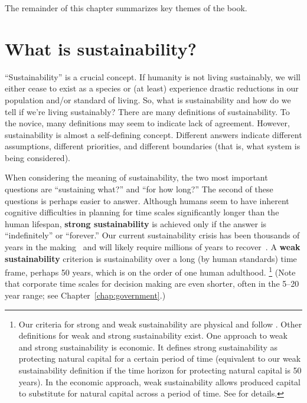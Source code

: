 \documentclass{article}\usepackage[]{graphicx}\usepackage[table]{xcolor}
\begin{document}
The remainder of this chapter summarizes key themes of the book.


\section{What is sustainability?}
\label{sec:what_is_sustainability}

``Sustainability'' is a crucial concept.
If humanity is not living sustainably, we will either cease to exist as a species
or (at least) experience drastic reductions in our population and/or standard of living.
So, what is sustainability and how do we tell if we're living sustainably?
There are many definitions of sustainability.
To the novice, many definitions may seem to indicate lack of agreement.
However, sustainability is almost a self-defining concept.
Different answers indicate different assumptions, different priorities, and different
boundaries (that is, what system is being considered).

When considering the meaning of sustainability, the two most important questions are
``sustaining what?'' and ``for how long?''
The second of these questions is perhaps easier to answer.
Although humans seem to have inherent cognitive difficulties in planning for
time scales significantly longer than the human lifespan,
\textbf{strong sustainability} is achieved only if the answer is
``indefinitely'' or ``forever.''
Our current sustainability crisis has been thousands of years in the making~\cite{Sanderman2017}
and will likely require millions of years to recover~\cite{Davis11262}.
A \textbf{weak sustainability} criterion is sustainability over a long (by human standards)
time frame, perhaps 50 years, which is on the order of one human adulthood.%
\footnote{
  Our criteria for strong and weak sustainability are physical and
  follow \citet{Graedel:2010ab}.
  Other definitions for weak and strong sustainability exist.
  One approach to weak and strong sustainability is economic.
  It defines strong sustainability as protecting natural capital 
  for a certain period of time
  (equivalent to our weak sustainability definition 
  if the time horizon for protecting natural capital is 50 years).
  In the economic approach,
  weak sustainability allows 
  produced capital
  to substitute for natural capital
  across a period of time.
  See \citet{Dietz:2007tu} for details.
}
(Note that corporate time scales for decision making are even shorter,
often in the 5--20 year range; see Chapter~\ref{chap:government}.)
\end{document}
